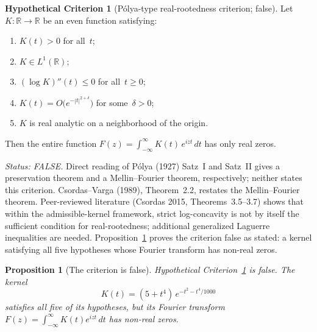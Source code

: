 \documentclass[11pt]{article}
\newtheorem{proposition}[theorem]{Proposition}
\theoremstyle{definition}
\newtheorem{hypothetical}[theorem]{Hypothetical Criterion}
\theoremstyle{remark}
\begin{document}
\begin{hypothetical}[P\'{o}lya-type real-rootedness criterion; false]%
\label{hcrit:polya_star}
Let $K : \mathbb{R} \to \mathbb{R}$ be an even function satisfying:
\begin{enumerate}[label=(\roman*)]
\item $K(t) > 0$ for all~$t$;
\item $K \in L^1(\mathbb{R})$;
\item $(\log K)''(t) \leq 0$ for all~$t \geq 0$;
\item $K(t) = O\bigl(e^{-|t|^{2+\delta}}\bigr)$ for some~$\delta > 0$;
\item $K$ is real analytic on a neighborhood of the origin.
\end{enumerate}
Then the entire function $F(z) = \int_{-\infty}^{\infty} K(t)\,e^{izt}\,dt$
has only real zeros.

\medskip\noindent\emph{Status: FALSE.}
Direct reading of P\'{o}lya (1927) Satz~I and Satz~II gives a preservation theorem
and a Mellin--Fourier theorem, respectively; neither states this criterion.
Csordas--Varga (1989), Theorem~2.2, restates the Mellin--Fourier theorem.
Peer-reviewed literature (Csordas 2015, Theorems~3.5--3.7) shows that within the
admissible-kernel framework, strict log-concavity is not by itself the sufficient
condition for real-rootedness; additional generalized Laguerre inequalities are needed.
Proposition~\ref{prop:counterexample} proves the criterion false as stated:
a kernel satisfying all five hypotheses whose Fourier transform has
non-real zeros.
\end{hypothetical}

\begin{proposition}[The criterion is false]\label{prop:counterexample}
Hypothetical Criterion~\ref{hcrit:polya_star} is false.
The kernel
\[
K(t) = (5 + t^4)\,e^{-t^2 - t^4/1000}
\]
satisfies all five of its hypotheses, but its Fourier transform
$F(z) = \int_{-\infty}^{\infty} K(t) e^{izt}\,dt$ has non-real zeros.
\end{proposition}
\end{document}
